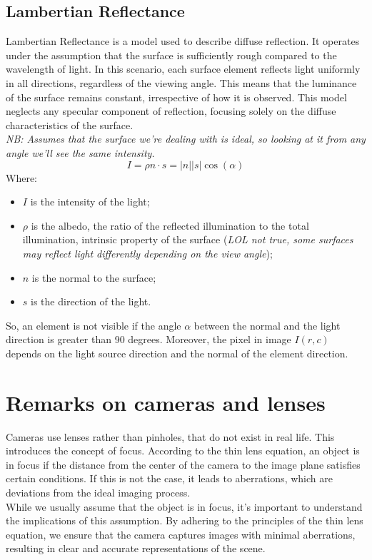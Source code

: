 \subsection{Lambertian Reflectance}
Lambertian Reflectance is a model used to describe diffuse reflection. It operates under the assumption that the surface is sufficiently rough compared to the wavelength of light. In this scenario, each surface element reflects light uniformly in all directions, regardless of the viewing angle. This means that the luminance of the surface remains constant, irrespective of how it is observed. 
This model neglects any specular component of reflection, focusing solely on the diffuse characteristics of the surface.
\\\textit{NB: Assumes that the surface we're dealing with is ideal, so looking at it from any angle we'll see the same intensity.}
\[
    I = \rho n \cdot s = |n||s|\cos(\alpha)  
\]
Where:
\begin{itemize}
    \item $I$ is the intensity of the light;
    \item $\rho$ is the albedo, the ratio of the reflected illumination to the total illumination, intrinsic property of the surface (\textit{LOL not true, some surfaces may reflect light differently depending on the view angle});
    \item $n$ is the normal to the surface;
    \item $s$ is the direction of the light.
\end{itemize}
So, an element is not visible if the angle $\alpha$ between the normal and the light direction is greater than 90 degrees.
Moreover, the pixel in image $I(r,c)$ depends on the light source direction and the normal of the element direction.

\section{Remarks on cameras and lenses}
Cameras use lenses rather than pinholes, that do not exist in real life. This introduces the concept of focus. 
According to the thin lens equation, an object is in focus if the distance from the center of the camera to the image plane satisfies certain conditions. 
If this is not the case, it leads to aberrations, which are deviations from the ideal imaging process.
\\
While we usually assume that the object is in focus, it's important to understand the implications of this assumption. 
By adhering to the principles of the thin lens equation, we ensure that the camera captures images with minimal aberrations, resulting in clear and accurate representations of the scene.
